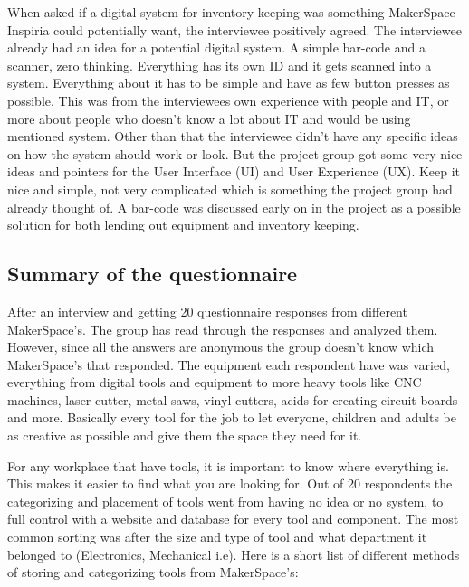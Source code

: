 When asked if a digital system for inventory keeping was something MakerSpace Inspiria could potentially want, the interviewee positively agreed. The interviewee already had an idea for a potential digital system. A simple bar-code and a scanner, zero thinking. Everything has its own ID and it gets scanned into a system. Everything about it has to be simple and have as few button presses as possible. This was from the interviewees own experience with people and IT, or more about people who doesn't know a lot about IT and would be using mentioned system. Other than that the interviewee didn't have any specific ideas on how the system should work or look. But the project group got some very nice ideas and pointers for the User Interface (UI) and User Experience (UX). Keep it nice and simple, not very complicated which is something the project group had already thought of. A bar-code was discussed early on in the project as a possible solution for both lending out equipment and inventory keeping. 

\subsection{Summary of the questionnaire}

After an interview and getting 20 questionnaire responses from different MakerSpace's. The group has read through the responses and analyzed them. However, since all the answers are anonymous the group doesn't know which MakerSpace's that responded. The equipment each respondent have was varied, everything from digital tools and equipment to more heavy tools like CNC machines, laser cutter, metal saws, vinyl cutters, acids for creating circuit boards and more. Basically every tool for the job to let everyone, children and adults be as creative as possible and give them the space they need for it. 

For any workplace that have tools, it is important to know where everything is. This makes it easier to find what you are looking for. Out of 20 respondents the categorizing and placement of tools went from having no idea or no system, to full control with a website and database for every tool and component. The most common sorting was after the size and type of tool and what department it belonged to (Electronics, Mechanical i.e). Here is a short list of different methods of storing and categorizing tools from MakerSpace's:

